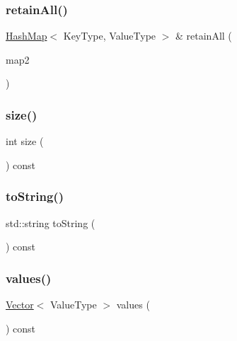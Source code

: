\mbox{\label{classHashMap_a1950d5bcede3332689f1080441cc065e}} 
\subsubsection{\texorpdfstring{retain\+All()}{retainAll()}}
{\footnotesize\ttfamily \mbox{\hyperlink{classHashMap}{Hash\+Map}}$<$ Key\+Type, Value\+Type $>$ \& retain\+All (\begin{DoxyParamCaption}\item[{const \mbox{\hyperlink{classHashMap}{Hash\+Map}}$<$ Key\+Type, Value\+Type $>$ \&}]{map2 }\end{DoxyParamCaption})}

\mbox{\label{classHashMap_af9593d4a5ff4274efaf429cb4f9e57cc}} 
\subsubsection{\texorpdfstring{size()}{size()}}
{\footnotesize\ttfamily int size (\begin{DoxyParamCaption}{ }\end{DoxyParamCaption}) const}

\mbox{\label{classHashMap_a1fe5121d6528fdea3f243321b3fa3a49}} 
\subsubsection{\texorpdfstring{to\+String()}{toString()}}
{\footnotesize\ttfamily std\+::string to\+String (\begin{DoxyParamCaption}{ }\end{DoxyParamCaption}) const}

\mbox{\label{classHashMap_a50ccbe4184324f0da975648a12728d20}} 
\subsubsection{\texorpdfstring{values()}{values()}}
{\footnotesize\ttfamily \mbox{\hyperlink{classVector}{Vector}}$<$ Value\+Type $>$ values (\begin{DoxyParamCaption}{ }\end{DoxyParamCaption}) const}



